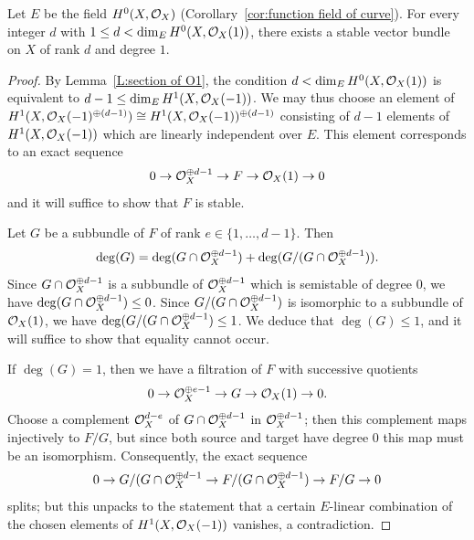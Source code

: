 \begin{lemma} \label{lem:construct stable degree 1}
Let $E$ be the field $H^0(X, \mathcal{O}_X)$ (Corollary~\ref{cor:function field of curve}).
For every integer $d$ with $1 \leq d < \dim_{E} H^0(X, \mathcal{O}_X(1))$,
there exists a stable vector bundle on $X$ of rank $d$ and degree $1$.
\end{lemma}
\begin{proof}
By Lemma~\ref{L:section of O1}, the condition $d < \dim_{E} H^0(X, \mathcal{O}_X(1))$
is equivalent to $d-1 \leq \dim_E H^1(X, \mathcal{O}_X(-1))$.
We may thus choose an element of $H^1(X, \mathcal{O}_X(-1)^{\oplus (d-1)}) \cong
H^1(X, \mathcal{O}_X(-1))^{\oplus (d-1)}$ consisting of $d-1$ elements of $H^1(X, \mathcal{O}_X(-1))$ which are linearly independent over $E$. This element corresponds to an exact sequence
\[
0 \to \mathcal{O}_X^{\oplus d-1} \to F \to \mathcal{O}_X(1) \to 0
\]
and it will suffice to show that $F$ is stable. 

Let $G$ be a subbundle of $F$ of rank $e \in \{1,\dots,d-1\}$. Then 
\[
\deg(G) = \deg(G \cap \mathcal{O}_X^{\oplus d-1})
+ \deg(G / (G \cap \mathcal{O}_X^{\oplus d-1})).
\]
Since $G \cap \mathcal{O}_X^{\oplus d-1}$ is a subbundle of $\mathcal{O}_X^{\oplus d-1}$ which is semistable of degree 0, we have $\deg(G \cap \mathcal{O}_X^{\oplus d-1}) \leq 0$.
Since $G / (G \cap \mathcal{O}_X^{\oplus d-1})$ is isomorphic to a subbundle of $\mathcal{O}_X(1)$, we have
$\deg(G / (G \cap \mathcal{O}_X^{\oplus d-1}) \leq 1$. We deduce that $\deg(G) \leq 1$,
and it will suffice to show that equality cannot occur.

If $\deg(G) = 1$, then we have a filtration of $F$ with successive quotients
\[
0 \to \mathcal{O}_X^{\oplus e-1} \to G \to \mathcal{O}_X(1) \to 0.
\]
Choose a complement $\mathcal{O}_X^{d-e}$ of $ G \cap \mathcal{O}_X^{\oplus d-1}$ in $\mathcal{O}_X^{\oplus d-1}$;
then this complement maps injectively to $F/G$, but since both source and target have degree 0 this map must be an isomorphism. Consequently, the exact sequence
\[
0 \to G/(G \cap \mathcal{O}_X^{\oplus d-1} \to F/(G \cap \mathcal{O}_X^{\oplus d-1}) \to F/G \to 0
\]
splits; but this unpacks to the statement that a certain $E$-linear combination of the chosen
elements of $H^1(X, \mathcal{O}_X(-1))$ vanishes, a contradiction.
\end{proof}

